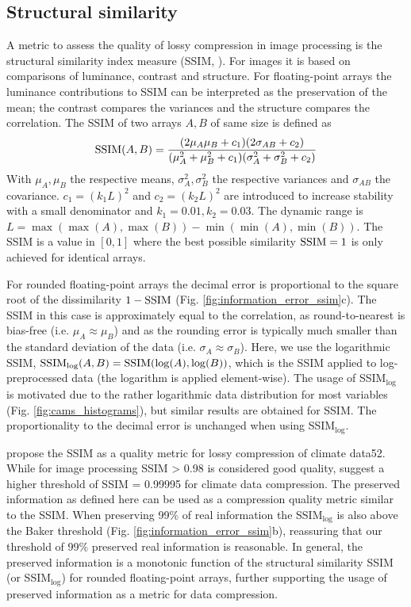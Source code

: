 \subsection{Structural similarity}

A metric to assess the quality of lossy compression in image processing is the structural similarity index measure (SSIM, \cite{Wang2004}).
For images it is based on comparisons of luminance, contrast and structure. For floating-point arrays the luminance contributions
to SSIM can be interpreted as the preservation of the mean; the contrast compares the variances and the structure compares the
correlation. The SSIM of two arrays $A,B$ of same size is defined as
	\begin{equation}
	\operatorname{SSIM}(A,B) = \frac{(2\mu_A\mu_B + c_1)(2\sigma_{AB} + c_2)}{(\mu_A^2 + \mu_B^2 + c_1)(\sigma^2_A + \sigma^2_B + c_2)}
	\end{equation}
With $\mu_A,\mu_B$ the respective means, $\sigma^2_A,\sigma^2_B$ the respective variances and $\sigma_{AB}$ the covariance.
$c_1 = (k_1L)^2$ and $c_2 = (k_2L)^2$  are introduced to increase stability with a small denominator and $k_1 = 0.01, k_2 = 0.03$.
The dynamic range is $L = \max(\max(A),\max(B)) - \min(\min(A),\min(B))$. The SSIM is a value in $[0,1]$ where the best possible
similarity $\operatorname{SSIM}=1$ is only achieved for identical arrays.

For rounded floating-point arrays the decimal error is proportional to the square root of the dissimilarity $1-\operatorname{SSIM}$
(Fig. \ref{fig:information_error_ssim}c). The SSIM in this case is approximately equal to the correlation, as round-to-nearest is
bias-free (i.e. $\mu_A \approx \mu_B$) and as the rounding error is typically much smaller than the standard deviation of the data
(i.e. $\sigma_A \approx \sigma_B$). Here, we use the logarithmic SSIM, $\operatorname{SSIM}_{\log}(A,B) = \operatorname{SSIM}(\log(A),\log(B))$,
which is the SSIM applied to log-preprocessed data (the logarithm is applied element-wise). The usage of SSIM$_{\log}$
is motivated due to the rather logarithmic data distribution for most variables (Fig. \ref{fig:cams_histograms}),
but similar results are obtained for SSIM. The proportionality to the decimal error is unchanged when using SSIM$_{\log}$.

\cite{Baker2019} propose the SSIM as a quality metric for lossy compression of climate data52. While for image processing
SSIM > 0.98 is considered good quality, \cite{Baker2019} suggest a higher threshold of SSIM = 0.99995 for climate data compression.
The preserved information as defined here can be used as a compression quality metric similar to the SSIM. When preserving 99\%
of real information the SSIM$_{\log}$ is also above the Baker threshold (Fig. \ref{fig:information_error_ssim}b), reassuring that our
threshold of 99\% preserved real information is reasonable. In general, the preserved information is a monotonic function of the
structural similarity SSIM (or SSIM$_{\log}$) for rounded floating-point arrays, further supporting the usage of preserved
information as a metric for data compression. 

